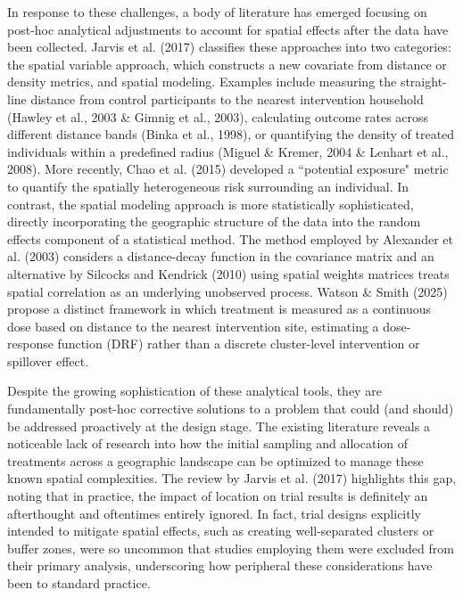 \documentclass{article}[11pt]
\begin{document}
In response to these challenges, a body of literature has emerged focusing on post-hoc analytical adjustments to account for spatial effects after the data have been collected. Jarvis et al. (2017) classifies these approaches into two categories: the spatial variable approach, which constructs a new covariate from distance or density metrics, and spatial modeling\cite{jarvis_spatial_2017}. Examples include measuring the straight-line distance from control participants to the nearest intervention household (Hawley et al., 2003 \& Gimnig et al., 2003)\cite{hawley_community-wide_2003}\cite{gimnig_effect_2003}, calculating outcome rates across different distance bands (Binka et al., 1998)\cite{binka_impact_1998}, or quantifying the density of treated individuals within a predefined radius (Miguel \& Kremer, 2004 \& Lenhart et al., 2008)\cite{miguel_worms_2004}\cite{lenhart_insecticidetreated_2008}. More recently, Chao et al. (2015) developed a ``potential exposure" metric to quantify the spatially heterogeneous risk surrounding an individual\cite{chao_contribution_2015}. In contrast, the spatial modeling approach is more statistically sophisticated, directly incorporating the geographic structure of the data into the random effects component of a statistical method. The method employed by Alexander et al. (2003)\cite{alexander_spatial_2003} considers a distance-decay function in the covariance matrix and an alternative by Silcocks and Kendrick (2010)\cite{silcocks_spatial_2010} using spatial weights matrices treats spatial correlation as an underlying unobserved process. Watson \& Smith (2025) propose a distinct framework in which treatment is measured as a continuous dose based on distance to the nearest intervention site, estimating a dose-response function (DRF) rather than a discrete cluster-level intervention or spillover effect\cite{watson_design_2025}.

Despite the growing sophistication of these analytical tools, they are fundamentally post-hoc corrective solutions to a problem that could (and should) be addressed proactively at the design stage. The existing literature reveals a noticeable lack of research into how the initial sampling and allocation of treatments across a geographic landscape can be optimized to manage these known spatial complexities. The review by Jarvis et al. (2017) highlights this gap, noting that in practice, the impact of location on trial results is definitely an afterthought and oftentimes entirely ignored\cite{jarvis_spatial_2017}. In fact, trial designs explicitly intended to mitigate spatial effects, such as creating well-separated clusters or buffer zones, were so uncommon that studies employing them were excluded from their primary analysis, underscoring how peripheral these considerations have been to standard practice\cite{jarvis_spatial_2017}. 
\end{document}
